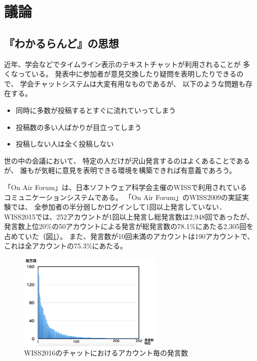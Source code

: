 \section{議論}

\subsection{『わかるらんど』の思想}

近年、学会などでタイムライン表示のテキストチャットが利用されることが
多くなっている\cite{WISSのチャットの報告論文}。
発表中に参加者が意見交換したり疑問を表明したりできるので、
学会チャットシステムは大変有用なものであるが、
以下のような問題も存在する。

\begin{itemize}
\item 同時に多数が投稿するとすぐに流れていってしまう
\item 投稿数の多い人ばかりが目立ってしまう
\item 投稿しない人は全く投稿しない
\end{itemize}

世の中の会議において、
特定の人だけが沢山発言するのはよくあることであるが、
誰もが気軽に意見を表明できる環境を構築できれば有意義であろう。

「On Air Forum」は、日本ソフトウェア科学会主催のWISSで利用されている
コミュニケーションシステムである。
「On Air Forum」のWISS2009の実証実験\cite{nishida2011}では、
全参加者の半分弱しかログインして1回以上発言していない．
WISS2015では、252アカウントが1回以上発言し総発言数は2,948回であったが、
発言数上位20\%の50アカウントによる発言が総発言数の78.1\%にあたる2,305回を占めていた（図\ref{wisschat}）。
また、発言数が10回未満のアカウントは190アカウントで、これは全アカウントの75.3\%にあたる。

\begin{figure}[h]
\centering
\includegraphics[width=7cm]{images/wisschat.png}
\caption{WISS2016のチャットにおけるアカウント毎の発言数}
\label{wisschat}
\end{figure}

